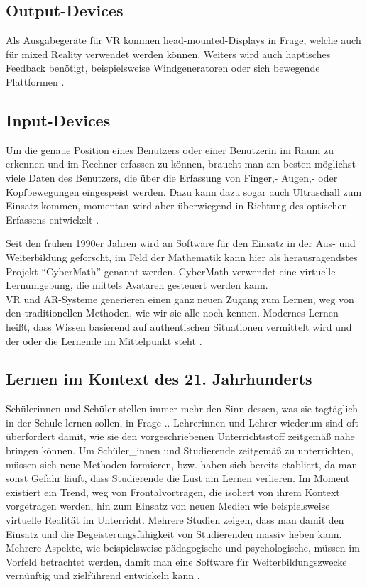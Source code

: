 \documentclass[deutsch]{llncs}
\begin{document}
\begin{itemize}
\subsection{Output-Devices}
Als Ausgabegeräte für VR kommen head-mounted-Displays in Frage, welche auch für mixed Reality verwendet werden können. Weiters wird auch haptisches Feedback benötigt, beispielsweise Windgeneratoren oder sich bewegende Plattformen \cite{Klampfer}.
\subsection{Input-Devices}
Um die genaue Position eines Benutzers oder einer Benutzerin im Raum zu erkennen und im Rechner erfassen zu können, braucht man am besten möglichst viele Daten des Benutzers, die über die Erfassung von Finger,- Augen,- oder Kopfbewegungen eingespeist werden. Dazu kann dazu sogar auch Ultraschall zum Einsatz kommen, momentan wird aber überwiegend in Richtung des optischen Erfassens entwickelt \cite{Klampfer}. 

\end{itemize}
Seit den frühen 1990er Jahren wird an Software für den Einsatz in der Aus- und Weiterbildung geforscht, im Feld der Mathematik kann hier als herausragendstes Projekt ``CyberMath'' genannt werden. CyberMath verwendet eine virtuelle Lernumgebung, die mittels Avataren gesteuert werden kann. \\
VR und AR-Systeme generieren einen ganz neuen Zugang zum Lernen, weg von den traditionellen Methoden, wie wir sie alle noch kennen. Modernes Lernen heißt, dass Wissen basierend auf authentischen Situationen vermittelt wird und der oder die Lernende im Mittelpunkt steht \cite{Klampfer}.
\cite{unknown}

\subsection{Lernen im Kontext des 21. Jahrhunderts}
Schülerinnen und Schüler stellen immer mehr den Sinn dessen, was sie tagtäglich in der Schule lernen sollen, in Frage \cite{Klampfer}.. Lehrerinnen und Lehrer wiederum sind oft überfordert damit, wie sie den vorgeschriebenen Unterrichtsstoff zeitgemäß nahe bringen können. Um Schüler\_innen und Studierende zeitgemäß zu unterrichten, müssen sich neue Methoden formieren, bzw. haben sich bereits etabliert, da man sonst Gefahr läuft, dass Studierende die Lust am Lernen verlieren. Im Moment existiert ein Trend, weg von Frontalvorträgen, die isoliert von ihrem Kontext vorgetragen werden, hin zum Einsatz von neuen Medien wie beispielsweise virtuelle Realität im Unterricht. Mehrere Studien \cite{Hu-Au} zeigen, dass man damit den Einsatz und die Begeisterungsfähigkeit von Studierenden massiv heben kann.
Mehrere Aspekte, wie beispielsweise pädagogische und psychologische, müssen im Vorfeld betrachtet werden, damit man eine Software für Weiterbildungszwecke vernünftig und zielführend entwickeln kann \cite{article}.
\end{document}
